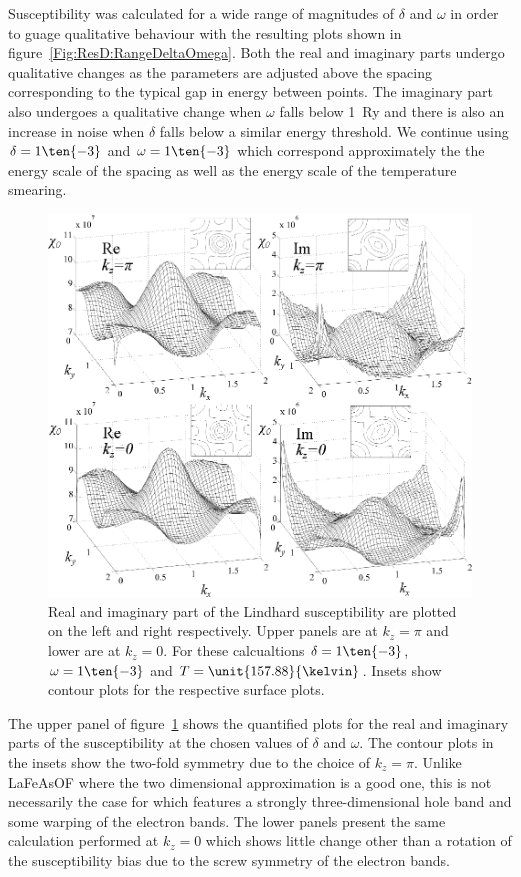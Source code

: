 Susceptibility was calculated for a wide range of magnitudes of $\delta$ and $\omega$ in order to guage qualitative behaviour with the resulting plots shown in figure~\ref{Fig:ResD:RangeDeltaOmega}. Both the real and imaginary parts undergo qualitative changes as the parameters are adjusted above the spacing corresponding to the typical gap in energy between points. The imaginary part also undergoes a qualitative change when $\omega$ falls below \unit{1}{Ry} and there is also an increase in noise when $\delta$ falls below a similar energy threshold. We continue using $\delta=1\ten{-3}$ and $\omega=1\ten{-3}$ which correspond approximately the the energy scale of the spacing as well as the energy scale of the temperature smearing.

\begin{figure}[htbp]
    \begin{center}
        \includegraphics[scale=0.9]{Chapter-dHvABaFe2P2/Figures/Susceptibility/2DSusceptibility/2DSusceptibilityPlusAltKz}
        \caption{Real and imaginary part of the Lindhard susceptibility are plotted on the left and right respectively. Upper panels are at $k_z=\pi$ and lower are at $k_z=0$. For these calcualtions $\delta=1\ten{-3}$, $\omega=1\ten{-3}$ and $T=\unit{157.88}{\kelvin}$. Insets show contour plots for the respective surface plots.}
        \label{Fig:ResD:2DSusceptibility}
    \end{center}
\end{figure}
The upper panel of figure~\ref{Fig:ResD:2DSusceptibility} shows the quantified plots for the real and imaginary parts of the susceptibility at the chosen values of $\delta$ and $\omega$. The contour plots in the insets show the two-fold symmetry due to the choice of $k_z=\pi$. Unlike LaFeAsOF where the two dimensional approximation is a good one, this is not necessarily the case for \BaFeP which features a strongly three-dimensional hole band and some warping of the electron bands. The lower panels present the same calculation performed at $k_z=0$ which shows little change other than a rotation of the susceptibility bias due to the screw symmetry of the electron bands.

